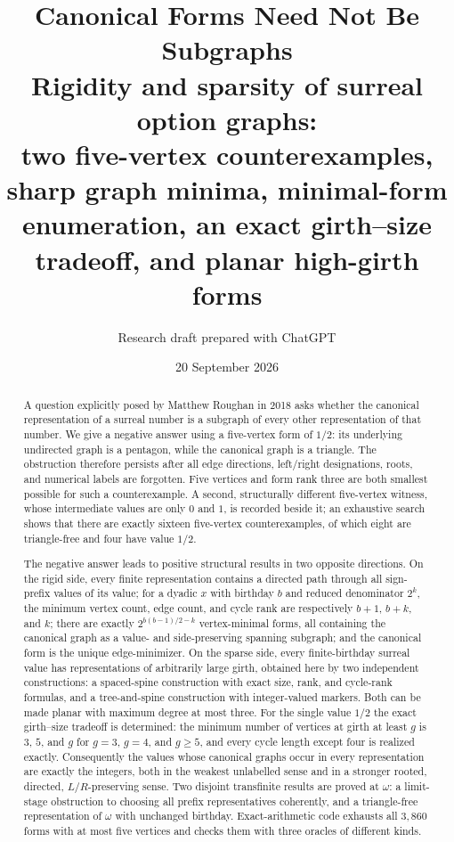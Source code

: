 \documentclass[11pt,a4paper]{article}
\title{\color{inkblue}\LARGE\bfseries Canonical Forms Need Not Be Subgraphs\\[5pt]
\large Rigidity and sparsity of surreal option graphs:\\
two five-vertex counterexamples, sharp graph minima, minimal-form\\
enumeration, an exact girth--size tradeoff, and planar high-girth forms}
\author{Research draft prepared with ChatGPT}
\date{20 September 2026}
\numberwithin{equation}{section}
\theoremstyle{definition}
\theoremstyle{remark}
\begin{document}
\maketitle
\thispagestyle{empty}
\begin{abstract}
A question explicitly posed by Matthew Roughan in 2018 asks whether the
canonical representation of a surreal number is a subgraph of every other
representation of that number. We give a negative answer using a five-vertex
form of $1/2$: its underlying undirected graph is a pentagon, while the canonical
graph is a triangle. The obstruction therefore persists after all edge
directions, left/right designations, roots, and numerical labels are forgotten.
Five vertices and form rank three are both smallest possible for such a
counterexample. A second, structurally different five-vertex witness, whose
intermediate values are only $0$ and $1$, is recorded beside it; an exhaustive
search shows that there are exactly sixteen five-vertex counterexamples, of
which eight are triangle-free and four have value $1/2$.

The negative answer leads to positive structural results in two opposite
directions. On the rigid side, every finite representation contains a directed
path through all sign-prefix values of its value; for a dyadic $x$ with birthday
$b$ and reduced denominator $2^k$, the minimum vertex count, edge count, and
cycle rank are respectively $b+1$, $b+k$, and $k$; there are exactly
$2^{b(b-1)/2-k}$ vertex-minimal forms, all containing the canonical graph as a
value- and side-preserving spanning subgraph; and the canonical form is the
unique edge-minimizer. On the sparse side, every finite-birthday surreal value
has representations of arbitrarily large girth, obtained here by two independent
constructions: a spaced-spine construction with exact size, rank, and cycle-rank
formulas, and a tree-and-spine construction with integer-valued markers. Both
can be made planar with maximum degree at most three. For the single value
$1/2$ the exact
girth--size tradeoff is determined: the minimum number of vertices at girth at
least $g$ is $3$, $5$, and $g$ for $g=3$, $g=4$, and $g\geq5$, and every cycle
length except four is realized exactly. Consequently the values whose canonical
graphs occur in every representation are exactly the integers, both in the
weakest unlabelled sense and in a stronger rooted, directed, $L/R$-preserving
sense. Two disjoint transfinite results are proved at $\omega$: a limit-stage
obstruction to choosing all prefix representatives coherently, and a
triangle-free representation of $\omega$ with unchanged birthday. Exact-arithmetic
code exhausts all $3{,}860$ forms with at most five vertices and checks them with
three oracles of different kinds.
\end{abstract}
\end{document}
